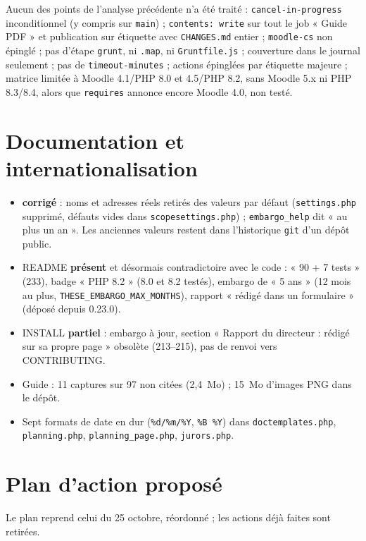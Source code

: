 \documentclass[11pt,a4paper]{article}
\newcommand{\fichier}[1]{\texttt{\small #1}}
\newcommand{\code}[1]{\texttt{#1}}
\newcommand{\corrige}{\textcolor{green!45!black}{\textbf{corrigé}}}
\newcommand{\partiel}{\textcolor{orange!80!black}{\textbf{partiel}}}
\newcommand{\present}{\textcolor{red!70!black}{\textbf{présent}}}
\begin{document}
Aucun des points de l'analyse précédente n'a été traité : \code{cancel-in-progress}
inconditionnel (y compris sur \code{main}) ; \code{contents: write} sur tout le job « Guide PDF »
et publication sur étiquette avec \fichier{CHANGES.md} entier ; \code{moodle-cs} non épinglé ;
pas d'étape \code{grunt}, ni \fichier{.map}, ni \fichier{Gruntfile.js} ; couverture dans le
journal seulement ; pas de \code{timeout-minutes} ; actions épinglées par étiquette majeure ;
matrice limitée à Moodle 4.1/PHP 8.0 et 4.5/PHP 8.2, sans Moodle 5.x ni PHP 8.3/8.4, alors que
\code{requires} annonce encore Moodle 4.0, non testé.

\section{Documentation et internationalisation}

\begin{itemize}
  \item \corrige{} : noms et adresses réels retirés des valeurs par défaut
    (\fichier{settings.php} supprimé, défauts vides dans \fichier{scopesettings.php}) ;
    \code{embargo\_help} dit « au plus un an ». Les anciennes valeurs restent dans l'historique
    \code{git} d'un dépôt public.
  \item README \present{} et désormais contradictoire avec le code : « 90 + 7 tests » (233),
    badge « PHP 8.2 » (8.0 et 8.2 testés), embargo de « 5 ans » (12 mois au plus,
    \code{THESE\_EMBARGO\_MAX\_MONTHS}), rapport « rédigé dans un formulaire » (déposé depuis
    0.23.0).
  \item INSTALL \partiel{} : embargo à jour, section « Rapport du directeur : rédigé sur sa propre
    page » obsolète (213--215), pas de renvoi vers CONTRIBUTING.
  \item Guide : 11 captures sur 97 non citées (2,4~Mo) ; 15~Mo d'images PNG dans le dépôt.
  \item Sept formats de date en dur (\code{\%d/\%m/\%Y}, \code{\%B \%Y}) dans
    \fichier{doctemplates.php}, \fichier{planning.php}, \fichier{planning\_page.php},
    \fichier{jurors.php}.
\end{itemize}

\section{Plan d'action proposé}

Le plan reprend celui du 25 octobre, réordonné ; les actions déjà faites sont retirées.
\end{document}
